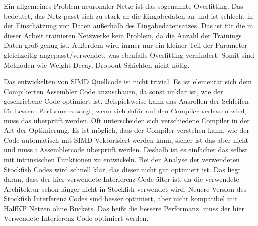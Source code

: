 
Ein allgemeines Problem neuronaler Netze ist das sogenannte Overfitting. Das bedeutet, das Netz passt sich zu stark an die Eingabedaten an und ist schlecht in der Einschätzung von Daten außerhalb des Eingabedatensatzes. Das ist für die in dieser Arbeit trainieren Netzwerke kein Problem, da die Anzahl der Trainings Daten groß genug ist. Außerdem wird immer nur ein kleiner Teil der Parameter gleichzeitig angepasst/verwendet, was ebenfalls Overfitting verhindert. Somit sind Methoden wie \zb{} Weight Decay, Dropout-Schichten nicht nötig.

Das entwickelten von \ac{SIMD} Quellcode ist nicht trivial. Es ist elementar sich dem Compilierten Assembler Code anzuschauen, da sonst unklar ist, wie der geschriebene Code optimiert ist. Beispielsweise kann das Ausrollen der Schleifen für bessere Performanz sorgt, wenn sich dafür auf den Compiler verlassen wird, muss das überprüft werden. Oft unterscheiden sich verschiedene Compiler in der Art der Optimierung. Es ist möglich, dass der Compiler verstehen kann, wie der Code automatisch mit \ac{SIMD} Vektorisiert werden kann, sicher ist das aber nicht und muss i Assemblercode überprüft werden. Deshalb ist es einfacher das selbst mit intrinsischen Funktionen zu entwickeln. Bei der Analyse der verwendeten Stockfish Codes wird schnell klar, das dieser nicht gut optimiert ist. Das liegt daran, dass der hier verwendete Interferenz Code älter ist, da die verwendete Architektur schon länger nicht in Stockfish verwendet wird. Neuere Version des Stockfish Interferenz Codes sind besser optimiert, aber nicht kompatibel mit HalfKP Netzen ohne Buckets. Das heißt die bessere Performanz, muss der hier Verwendete Interferenz Code optimiert werden.